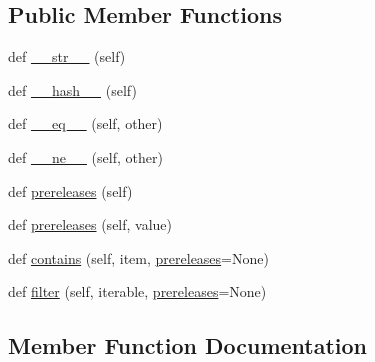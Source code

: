 \subsection*{Public Member Functions}
\begin{DoxyCompactItemize}
\item 
def \hyperlink{classsetuptools_1_1__vendor_1_1packaging_1_1specifiers_1_1_base_specifier_af2492d75efc5024463fb36f0681aff9f}{\+\_\+\+\_\+str\+\_\+\+\_\+} (self)
\item 
def \hyperlink{classsetuptools_1_1__vendor_1_1packaging_1_1specifiers_1_1_base_specifier_ad769821d15309817eff93467f2fb791b}{\+\_\+\+\_\+hash\+\_\+\+\_\+} (self)
\item 
def \hyperlink{classsetuptools_1_1__vendor_1_1packaging_1_1specifiers_1_1_base_specifier_a874f0252aa810d81537f36cb14c265fd}{\+\_\+\+\_\+eq\+\_\+\+\_\+} (self, other)
\item 
def \hyperlink{classsetuptools_1_1__vendor_1_1packaging_1_1specifiers_1_1_base_specifier_ae9450f0fde0473c01dc7ff41b2d3ba0f}{\+\_\+\+\_\+ne\+\_\+\+\_\+} (self, other)
\item 
def \hyperlink{classsetuptools_1_1__vendor_1_1packaging_1_1specifiers_1_1_base_specifier_a60ff51a26252f2e4f864fa33be33590d}{prereleases} (self)
\item 
def \hyperlink{classsetuptools_1_1__vendor_1_1packaging_1_1specifiers_1_1_base_specifier_a277ac572376967bf297c113bb9fc14ee}{prereleases} (self, value)
\item 
def \hyperlink{classsetuptools_1_1__vendor_1_1packaging_1_1specifiers_1_1_base_specifier_a402e2a53386037e402b56c6ed76890dc}{contains} (self, item, \hyperlink{classsetuptools_1_1__vendor_1_1packaging_1_1specifiers_1_1_base_specifier_a60ff51a26252f2e4f864fa33be33590d}{prereleases}=None)
\item 
def \hyperlink{classsetuptools_1_1__vendor_1_1packaging_1_1specifiers_1_1_base_specifier_ae543a3bd83e32a3ae2ff42f9179f3728}{filter} (self, iterable, \hyperlink{classsetuptools_1_1__vendor_1_1packaging_1_1specifiers_1_1_base_specifier_a60ff51a26252f2e4f864fa33be33590d}{prereleases}=None)
\end{DoxyCompactItemize}


\subsection{Member Function Documentation}
\mbox{\label{classsetuptools_1_1__vendor_1_1packaging_1_1specifiers_1_1_base_specifier_a874f0252aa810d81537f36cb14c265fd}} 
